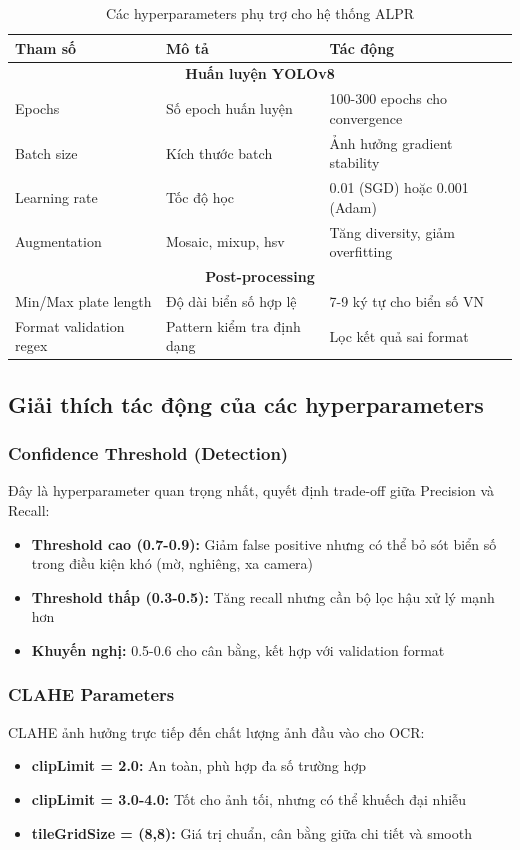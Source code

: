 \begin{table}[!ht]
\centering
\caption{Các hyperparameters phụ trợ cho hệ thống ALPR}
\label{tab:alpr_hyperparams_mid}
\begin{tabular}{|l|p{5cm}|p{5cm}|}
\hline
\textbf{Tham số} & \textbf{Mô tả} & \textbf{Tác động} \\ \hline
\multicolumn{3}{|c|}{\textbf{Huấn luyện YOLOv8}} \\ \hline
Epochs & Số epoch huấn luyện & 100-300 epochs cho convergence \\ \hline
Batch size & Kích thước batch & Ảnh hưởng gradient stability \\ \hline
Learning rate & Tốc độ học & 0.01 (SGD) hoặc 0.001 (Adam) \\ \hline
Augmentation & Mosaic, mixup, hsv & Tăng diversity, giảm overfitting \\ \hline
\multicolumn{3}{|c|}{\textbf{Post-processing}} \\ \hline
Min/Max plate length & Độ dài biển số hợp lệ & 7-9 ký tự cho biển số VN \\ \hline
Format validation regex & Pattern kiểm tra định dạng & Lọc kết quả sai format \\ \hline
\end{tabular}
\end{table}

\subsection{Giải thích tác động của các hyperparameters}

\subsubsection{Confidence Threshold (Detection)}
Đây là hyperparameter quan trọng nhất, quyết định trade-off giữa Precision và Recall:
\begin{itemize}
    \item \textbf{Threshold cao (0.7-0.9):} Giảm false positive nhưng có thể bỏ sót biển số trong điều kiện khó (mờ, nghiêng, xa camera)
    \item \textbf{Threshold thấp (0.3-0.5):} Tăng recall nhưng cần bộ lọc hậu xử lý mạnh hơn
    \item \textbf{Khuyến nghị:} 0.5-0.6 cho cân bằng, kết hợp với validation format
\end{itemize}

\subsubsection{CLAHE Parameters}
CLAHE ảnh hưởng trực tiếp đến chất lượng ảnh đầu vào cho OCR:
\begin{itemize}
    \item \textbf{clipLimit = 2.0:} An toàn, phù hợp đa số trường hợp
    \item \textbf{clipLimit = 3.0-4.0:} Tốt cho ảnh tối, nhưng có thể khuếch đại nhiễu
    \item \textbf{tileGridSize = (8,8):} Giá trị chuẩn, cân bằng giữa chi tiết và smooth
\end{itemize}

